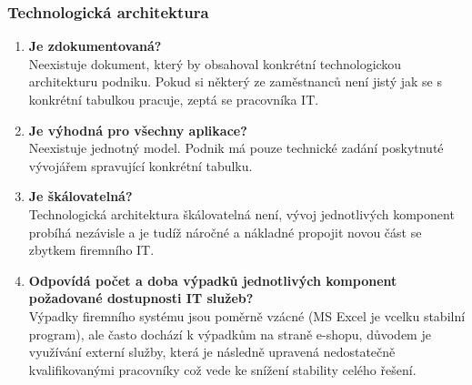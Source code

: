 \documentclass{article}
\begin{document}
\subsubsection*{Technologická architektura}
\begin{enumerate}
    \item \textbf{Je zdokumentovaná?} \\
        Neexistuje dokument, který by obsahoval konkrétní technologickou architekturu podniku. Pokud si některý ze zaměstnanců není jistý jak se s konkrétní tabulkou pracuje, zeptá se pracovníka IT.

    \item \textbf{Je výhodná pro všechny aplikace?} \\
        Neexistuje jednotný model. Podnik má pouze technické zadání poskytnuté vývojářem spravující konkrétní tabulku.

    \item \textbf{Je škálovatelná?} \\
        Technologická architektura škálovatelná není, vývoj jednotlivých komponent probíhá nezávisle a je tudíž náročné a nákladné propojit novou část se zbytkem firemního IT.

    \item \textbf{Odpovídá počet a doba výpadků jednotlivých komponent požadované dostupnosti IT služeb?} \\
        Výpadky firemního systému jsou poměrně vzácné (MS Excel je vcelku stabilní program), ale často dochází k výpadkům na straně e-shopu, důvodem je využívání externí služby, která je následně upravená nedostatečně kvalifikovanými pracovníky což vede ke snížení stability celého řešení.
\end{enumerate}
\end{document}
